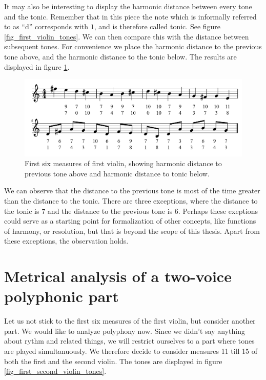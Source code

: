 \documentclass[a4paper]{book}
\theoremstyle{definition}
\begin{document}
It may also be interesting to display the harmonic distance between every tone and the tonic.
Remember that in this piece the note which is informally referred to as ``d'' corresponds with $1$, and is therefore called tonic.
See figure \ref{fig_first_violin_tones}.
We can then compare this with the distance between subsequent tones.
For convenience we place the harmonic distance to the previous tone above, and the harmonic distance to the tonic below.
The results are displayed in figure \ref{fig_first_violin_harmonic_distance_to_tonic}.

\begin{figure}[H]
    \centering
    \includegraphics[scale=0.25]{figures/fig_first_violin_harmonic_distance_to_tonic.png}
    \caption{First six measures of first violin, showing harmonic distance to previous tone above and harmonic distance to tonic below.}
    \label{fig_first_violin_harmonic_distance_to_tonic}
\end{figure}

We can observe that the distance to the previous tone is most of the time greater than the distance to the tonic.
There are three exceptions, where the distance to the tonic is $7$ and the distance to the previous tone is $6$.
Perhaps these exeptions could serve as a starting point for formalization of other concepts, like functions of harmony, or resolution, but that is beyond the scope of this thesis.
Apart from these exceptions, the observation holds.

\section{Metrical analysis of a two-voice polyphonic part}
Let us not stick to the first six measures of the first violin, but consider another part.
We would like to analyze polyphony now.
Since we didn't say anything about rythm and related things, we will restrict ourselves to a part where tones are played simultanuously.
We therefore decide to consider measures 11 till 15 of both the first and the second violin.
The tones are displayed in figure \ref{fig_first_second_violin_tones}.
\end{document}
